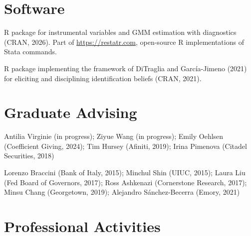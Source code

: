 \documentclass[line,overlapped]{myres}
\begin{document}
\begin{resume}
\section{\sc Software}
\begin{description}[style=multiline,leftmargin=3cm,font=\normalfont]
  \item[\texttt{ivreg2r}:] R package for instrumental variables and GMM estimation with diagnostics (CRAN, 2026). Part of \url{https://restatr.com}, open-source R implementations of Stata commands.
  \item[\texttt{ivdoctr}:] R package implementing the framework of DiTraglia and Garc\'{i}a-Jimeno (2021) for eliciting and disciplining identification beliefs (CRAN, 2021).
\end{description}


\section{\sc Graduate Advising}
\begin{description}[style=multiline,leftmargin=3cm,font=\normalfont]
  \item[Main or Joint Supervisor:] Antilia Virginie (in progress); Ziyue Wang (in progress); Emily Oehlsen (Coefficient Giving, 2024); Tim Hursey (Afiniti, 2019); Irina Pimenova (Citadel Securities, 2018)
  \item[Committee \\ Member:] Lorenzo Braccini (Bank of Italy, 2015); Minchul Shin (UIUC, 2015); Laura Liu (Fed Board of Governors, 2017); Ross Ashkenazi (Cornerstone Research, 2017); Minsu Chang (Georgetown, 2019); Alejandro S\'{a}nchez-Becerra (Emory, 2021)
\end{description}


\section{\sc Professional Activities}


\end{resume}
\end{document}
